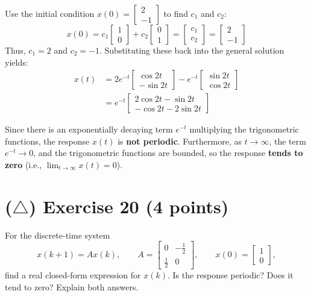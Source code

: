 \documentclass[12pt,a4paper]{article}
\begin{document}
Use the initial condition $x(0) = \begin{bmatrix} 2 \\ -1 \end{bmatrix}$ to find $c_1$ and $c_2$:
\[
x(0) = c_1 \begin{bmatrix} 1 \\ 0 \end{bmatrix} + c_2 \begin{bmatrix} 0 \\ 1 \end{bmatrix} = \begin{bmatrix} c_1 \\ c_2 \end{bmatrix} = \begin{bmatrix} 2 \\ -1 \end{bmatrix}
\]
Thus, $c_1 = 2$ and $c_2 = -1$. Substituting these back into the general solution yields:
\begin{align*}
	x(t) &= 2 e^{-t} \begin{bmatrix} \cos 2t \\ -\sin 2t \end{bmatrix} - e^{-t} \begin{bmatrix} \sin 2t \\ \cos 2t \end{bmatrix} \\
	&= e^{-t} \begin{bmatrix} 2\cos 2t - \sin 2t \\ -\cos 2t - 2\sin 2t \end{bmatrix}
\end{align*}

Since there is an exponentially decaying term $e^{-t}$ multiplying the trigonometric functions, the response $x(t)$ is \textbf{not periodic}. 
Furthermore, as $t \to \infty$, the term $e^{-t} \to 0$, and the trigonometric functions are bounded, so the response \textbf{tends to zero} (i.e., $\lim_{t \to \infty} x(t) = 0$).

\vspace{3cm}
\vfill
\section*{($\triangle$) Exercise 20 \hfill {\normalsize (4 points)}}
For the discrete-time system
\[
x(k+1)=Ax(k),\qquad
A=\begin{bmatrix}0&-\tfrac12\\[2pt]\tfrac12&0\end{bmatrix},\qquad
x(0)=\begin{bmatrix}1\\0\end{bmatrix},
\]
find a real closed-form expression for $x(k)$. Is the response periodic? Does it tend to zero? Explain both answers.
\end{document}

